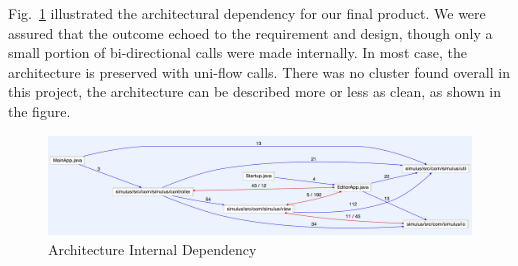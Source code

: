 Fig.~\ref{fig:archIntDependency} illustrated the architectural dependency for our final product. We were assured that the outcome echoed to the requirement and design, though only a small portion of bi-directional calls were made internally. In most case, the architecture is preserved with uni-flow calls. There was no cluster found overall in this project, the architecture can be described more or less as clean, as shown in the figure. 

\begin{figure}[h]
	\begin{center}
			\includegraphics[width=\textwidth]{img/archIntDependency.png}
		\caption{Architecture Internal Dependency}
	\label{fig:archIntDependency}
	\end{center}
\end{figure}
\clearpage

